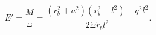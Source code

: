 \begin{equation}
  E'=\frac{M}{\Xi} =\frac{(r_b^2+a^2)(r_b^2-l^2)-q^2 l^2}{2\Xi r_b l^2}.
\label{kmass2}
\end{equation}

